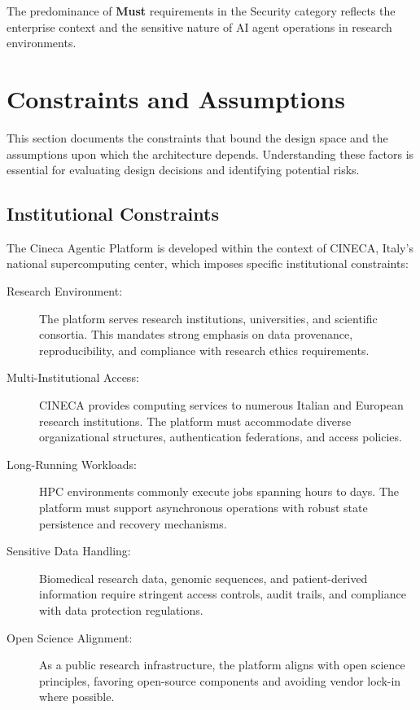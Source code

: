 \documentclass[a4paper,twoside]{sapthesis}
\begin{document}
The predominance of \textbf{Must} requirements in the Security category reflects the enterprise context and the sensitive nature of AI agent operations in research environments.

\section{Constraints and Assumptions}
\label{sec:constraints-assumptions}

This section documents the constraints that bound the design space and the assumptions upon which the architecture depends. Understanding these factors is essential for evaluating design decisions and identifying potential risks.

\subsection{Institutional Constraints}
\label{subsec:institutional-constraints}

The Cineca Agentic Platform is developed within the context of CINECA, Italy's national supercomputing center, which imposes specific institutional constraints:

\begin{description}
    \item[Research Environment:] The platform serves research institutions, universities, and scientific consortia. This mandates strong emphasis on data provenance, reproducibility, and compliance with research ethics requirements.
    
    \item[Multi-Institutional Access:] CINECA provides computing services to numerous Italian and European research institutions. The platform must accommodate diverse organizational structures, authentication federations, and access policies.
    
    \item[Long-Running Workloads:] HPC environments commonly execute jobs spanning hours to days. The platform must support asynchronous operations with robust state persistence and recovery mechanisms.
    
    \item[Sensitive Data Handling:] Biomedical research data, genomic sequences, and patient-derived information require stringent access controls, audit trails, and compliance with data protection regulations.
    
    \item[Open Science Alignment:] As a public research infrastructure, the platform aligns with open science principles, favoring open-source components and avoiding vendor lock-in where possible.
\end{description}
\end{document}
